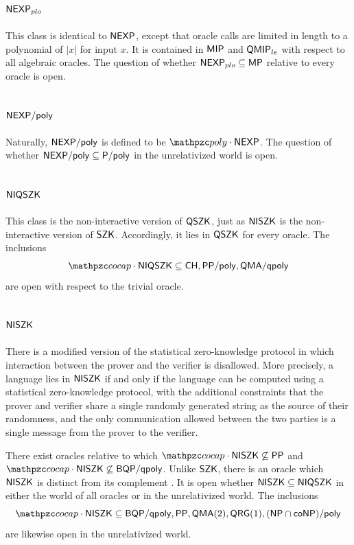 \subsection{$\mathsf{NEXP}_{plo}$}

This class is identical to $\mathsf{NEXP}$, except that oracle calls are limited in
length to a polynomial of $|x|$ for input $x$. It is contained in $\mathsf{MIP}$ 
\cite{aaronson2009algebrization} and $\mathsf{QMIP}_{le}$ \cite{ito2012multi} with 
respect to all algebraic oracles. The question of whether 
$\mathsf{NEXP}_{plo}\subseteq\mathsf{MP}$ relative to every oracle is open.

\subsection{$\mathsf{NEXP}/\mathsf{poly}$}

Naturally, $\mathsf{NEXP}/\mathsf{poly}$ is defined to be $\cpoly\cdot\msf{NEXP}$. The 
question of whether $\mathsf{NEXP}/\mathsf{poly}\subseteq\mathsf{P}/\mathsf{poly}$ in the unrelativized 
world is open.

\subsection{$\mathsf{NIQSZK}$}

This class is the non-interactive version of $\mathsf{QSZK}$, just as $\mathsf{NISZK}$
is the non-interactive version of $\mathsf{SZK}$. Accordingly, it lies in 
$\mathsf{QSZK}$ for every oracle. The inclusions 
\[
\cocap\cdot\msf{NIQSZK}\subseteq\msf{CH},\msf{PP}/\poly,\msf{QMA}/\msf{qpoly}
\]
are open with respect to the trivial oracle.

\subsection{$\mathsf{NISZK}$}
There is a modified version of the statistical zero-knowledge protocol in which 
interaction between the prover and the verifier is disallowed. More precisely, a
language lies in $\mathsf{NISZK}$ if and only if the language can be computed using
a statistical zero-knowledge protocol, with the additional constraints that the 
prover and verifier share a single randomly generated string as the source of 
their randomness, and the only communication allowed between the two parties is 
a single message from the prover to the verifier.

There exist oracles relative to which 
$\cocap\cdot\msf{NISZK}\not\subseteq\msf{PP}$ \cite{bouland2017power} and 
$\cocap\cdot\msf{NISZK}\not\subseteq\msf{BQP}/\msf{qpoly}$. Unlike $\mathsf{SZK}$, 
there is an oracle which $\mathsf{NISZK}$ is distinct from its complement 
\cite{lovett2017impossibility}. It is open whether 
$\mathsf{NISZK}\subseteq\mathsf{NIQSZK}$ in either the world of all oracles or in the 
unrelativized world. The inclusions
\[
\cocap\cdot\msf{NISZK}\subseteq\msf{BQP}/\msf{qpoly},\msf{PP},\msf{QMA}(2),
\msf{QRG}(1),(\NP\cap\co\NP)/\poly
\]
are likewise open in the unrelativized world.

